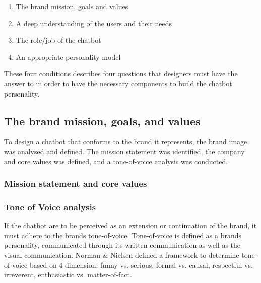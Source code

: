 \begin{enumerate}
    \item The brand mission, goals and values
    \item A deep understanding of the users and their needs
    \item The role/job of the chatbot
    \item An appropriate personality model
\end{enumerate}

These four conditions describes four questions that designers must have the answer to in order to have the necessary components to build the chatbot personality.

\vspace{5mm} %

    \subsection{The brand mission, goals, and values}
    To design a chatbot that conforms to the brand it represents, the brand image was analysed and defined. The mission statement was identified, the company and core values was defined, and a tone-of-voice analysis was conducted.
    
        \subsubsection{Mission statement and core values}
    
    
        \subsubsection{Tone of Voice analysis}
    
        If the chatbot are to be perceived as an extension or continuation of the brand, it must adhere to the brands tone-of-voice. Tone-of-voice is defined as a brands personality, communicated through its written communication as well as the visual communication. Norman & Nielsen defined a framework to determine tone-of-voice based on 4 dimension: funny vs. serious, formal vs. causal, respectful vs. irreverent, enthusiastic vs. matter-of-fact.
    
